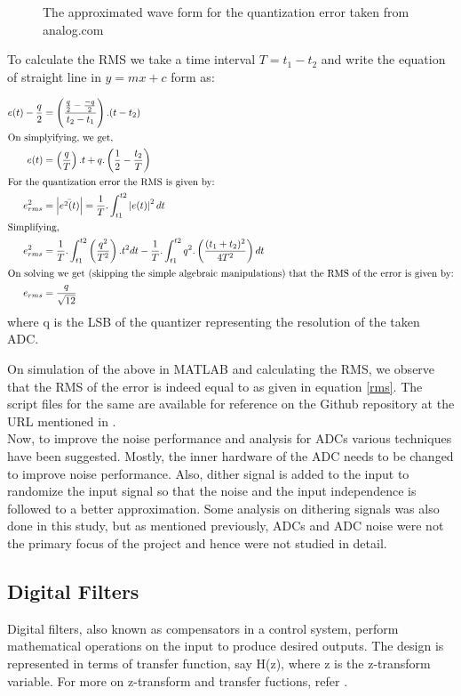 \documentclass[colorlinks=true,pdfstartview=FitV,linkcolor=blue,
            citecolor=red,urlcolor=magenta]{ligodoc}
\begin{document}
	\begin{figure}[H]
 
  		\centering
		\def\svgscale{1}
 		\tiny{
 		
 		}
	  	\caption{The approximated wave form for the quantization error taken from analog.com}
 	 	\label{error}
	\end{figure}

To calculate the RMS we take a time interval $T = t_{1}-t_{2}$ and write the equation of straight line in $y=mx+c$ form as:

\begin{align}
e(t)-\frac{q}{2}&=\left(\frac{\frac{q}{2}-\frac{-q}{2}}{t_{2}-t_{1}}\right).(t-t_{2})\\
\intertext{On simplyifying, we get,}
e(t)&=\left(\frac{q}{T}\right).t + q .\left(\frac{1}{2}-\frac{t_{2}}{T}\right)\\
\intertext{For the quantization error the RMS is given by: }
e_{rms}^{2}&=\left|\bar{e^{2}(t)}\right|=\frac{1}{T}.\int_{t1}^{t2} \left|e(t)\right|^{2} dt\\
\intertext{Simplifying,}
e_{rms}^{2}&=\frac{1}{T}.\int_{t1}^{t2} \left(\frac{q^{2}}{T^{2}}\right).t^{2} dt  -\frac{1}{T}.\int_{t1}^{t2} q^{2}.\left(\frac{(t_{1}+t_{2})^{2}}{4T^{2}}\right) dt\\
\intertext{On solving we get (skipping the simple algebraic manipulations) that the RMS of 
the error is given by:}
\label{rms}
e_{rms}&=\frac{q}{\sqrt{12}}
\end{align}
where q is the LSB of the quantizer representing the resolution of the taken ADC.

On simulation of the above in MATLAB and calculating the RMS, we observe that the RMS of the error is indeed equal to as given in equation \ref{rms}. The script files for the same are available for reference on the Github repository at the URL mentioned in \cite{Git}.
\\
Now, to improve the noise performance and analysis for ADCs various techniques have been suggested. Mostly, the inner hardware of the ADC needs to be changed to improve noise performance. Also, dither signal is added to the input to randomize the input signal so that the noise and the input independence is followed to a better approximation. Some analysis on dithering signals\cite{Pandey} was also done in this study, but as mentioned previously, ADCs and ADC noise were not the primary focus of the project and hence were not studied in detail.
    \subsection{Digital Filters}
    Digital filters, also known as compensators in a control system, perform mathematical operations on the input to produce desired outputs. The design is represented in terms of transfer function, say H(z), where z is the z-transform variable. For more on z-transform and transfer fuctions, refer \cite{Z transform}. \\
    
\end{document}
